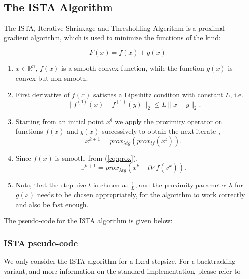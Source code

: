 \subsection{The ISTA Algorithm}

The ISTA, Iterative Shrinkage and Thresholding Algorithm \cite{FISTA} is a proximal gradient algorithm, which is used to 
minimize the functions of the kind:

\begin{equation}
 F(x) = f(x) + g(x)
\end{equation}

\begin{enumerate}
 \item $x \in \mathbb{R}^n$, $f(x)$ is a smooth convex function, while the function $g(x)$ is convex but non-smooth.
 \item First derivative of $f(x)$ satisfies a Lipschitz conditon with constant $L$, i.e.
\begin{equation}
   \| f^{(1)}(x) - f^{(1)}(y)\|_2 \leq L \| x-y \|_2 .  
   \label{eq:lip}
   \end{equation} 
 \item Starting from an initial point $x^0$ we apply the proximity operator on functions $f(x)$ and $g(x)$ successively to obtain the next iterate \cite{Proximal},
 \begin{equation}
  x^{k+1} = prox_{\lambda tg}(prox_{tf}(x^k)).
 \end{equation}
 \item Since $f(x)$ is smooth, from (\ref{eq:prox}), 
 \begin{equation}
  x^{k+1} = prox_{\lambda tg} \left( x^k - t \nabla f(x^k) \right).
 \end{equation} 
 \item Note, that the step size $t$ is chosen as $\frac{1}{L}$, and the proximity parameter $\lambda$ for $g(x)$ needs to be chosen appropriately, for the algorithm to work correctly and also be fast enough. 
 \end{enumerate}

The pseudo-code for the ISTA algorithm is given below:

\subsubsection{ISTA pseudo-code}
We only consider the ISTA algorithm for a fixed stepsize. 
For a backtracking variant, and more information on the standard implementation, please
refer to \cite{FISTA}


